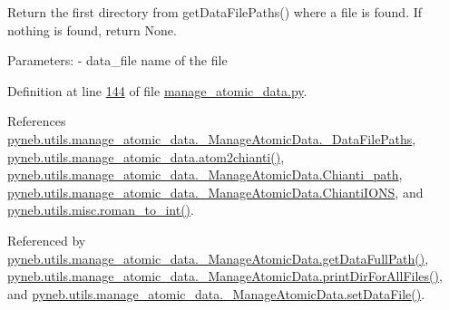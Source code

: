 \begin{DoxyVerb}Return the first directory from getDataFilePaths() where a file is found.
If nothing is found, return None.

Parameters:
   - data_file    name of the file\end{DoxyVerb}
 

Definition at line \hyperlink{manage__atomic__data_8py_source_l00144}{144} of file \hyperlink{manage__atomic__data_8py_source}{manage\-\_\-atomic\-\_\-data.\-py}.



References \hyperlink{manage__atomic__data_8py_source_l00104}{pyneb.\-utils.\-manage\-\_\-atomic\-\_\-data.\-\_\-\-Manage\-Atomic\-Data.\-\_\-\-Data\-File\-Paths}, \hyperlink{manage__atomic__data_8py_source_l00009}{pyneb.\-utils.\-manage\-\_\-atomic\-\_\-data.\-atom2chianti()}, \hyperlink{manage__atomic__data_8py_source_l00478}{pyneb.\-utils.\-manage\-\_\-atomic\-\_\-data.\-\_\-\-Manage\-Atomic\-Data.\-Chianti\-\_\-path}, \hyperlink{manage__atomic__data_8py_source_l00477}{pyneb.\-utils.\-manage\-\_\-atomic\-\_\-data.\-\_\-\-Manage\-Atomic\-Data.\-Chianti\-I\-O\-N\-S}, and \hyperlink{misc_8py_source_l00095}{pyneb.\-utils.\-misc.\-roman\-\_\-to\-\_\-int()}.



Referenced by \hyperlink{manage__atomic__data_8py_source_l00339}{pyneb.\-utils.\-manage\-\_\-atomic\-\_\-data.\-\_\-\-Manage\-Atomic\-Data.\-get\-Data\-Full\-Path()}, \hyperlink{manage__atomic__data_8py_source_l00172}{pyneb.\-utils.\-manage\-\_\-atomic\-\_\-data.\-\_\-\-Manage\-Atomic\-Data.\-print\-Dir\-For\-All\-Files()}, and \hyperlink{manage__atomic__data_8py_source_l00380}{pyneb.\-utils.\-manage\-\_\-atomic\-\_\-data.\-\_\-\-Manage\-Atomic\-Data.\-set\-Data\-File()}.


